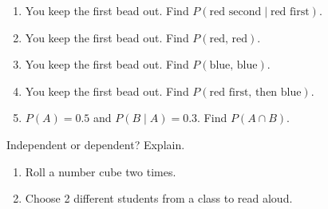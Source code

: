 \documentclass[11pt]{article}
\begin{document}
\begin{enumerate}[resume]
\begin{enumerate}
  \work{3.5em}
  \item You keep the first bead out. Find $P(\text{red second} \mid \text{red first})$.

  \work{3.5em}
  \item You keep the first bead out. Find $P(\text{red, red})$.

  \work{3.5em}
  \item You keep the first bead out. Find $P(\text{blue, blue})$.

  \work{3.5em}
  \item You keep the first bead out. Find $P(\text{red first, then blue})$.

  \work{3.5em}
  \item $P(A) = 0.5$ and $P(B \mid A) = 0.3$. Find $P(A \cap B)$.

  \work{3.5em}
\end{enumerate}

\vspace{0.4em}
Independent or dependent? Explain.
\begin{enumerate}[start=7]
  \item Roll a number cube two times.

  \work{3.5em}
  \item Choose 2 different students from a class to read aloud.

  \work{3.5em}
\end{enumerate}

\end{enumerate}
\end{document}
